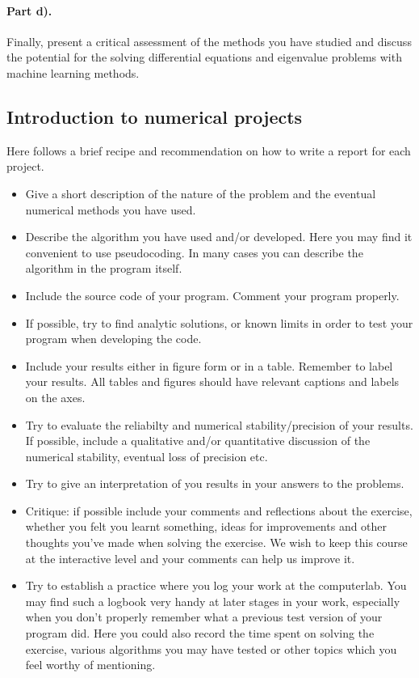 \documentclass[%
oneside,                 %
final,                   %
10pt]{article}
\begin{document}
\paragraph{Part d).}
Finally, present a critical assessment of the methods you have studied and discuss the potential for the solving differential equations and eigenvalue problems with machine learning methods. 

\subsection*{Introduction to numerical projects}

Here follows a brief recipe and recommendation on how to write a report for each
project.

\begin{itemize}
  \item Give a short description of the nature of the problem and the eventual  numerical methods you have used.

  \item Describe the algorithm you have used and/or developed. Here you may find it convenient to use pseudocoding. In many cases you can describe the algorithm in the program itself.

  \item Include the source code of your program. Comment your program properly.

  \item If possible, try to find analytic solutions, or known limits in order to test your program when developing the code.

  \item Include your results either in figure form or in a table. Remember to        label your results. All tables and figures should have relevant captions        and labels on the axes.

  \item Try to evaluate the reliabilty and numerical stability/precision of your results. If possible, include a qualitative and/or quantitative discussion of the numerical stability, eventual loss of precision etc.

  \item Try to give an interpretation of you results in your answers to  the problems.

  \item Critique: if possible include your comments and reflections about the  exercise, whether you felt you learnt something, ideas for improvements and  other thoughts you've made when solving the exercise. We wish to keep this course at the interactive level and your comments can help us improve it.

  \item Try to establish a practice where you log your work at the  computerlab. You may find such a logbook very handy at later stages in your work, especially when you don't properly remember  what a previous test version  of your program did. Here you could also record  the time spent on solving the exercise, various algorithms you may have tested or other topics which you feel worthy of mentioning.
\end{itemize}
\end{document}
